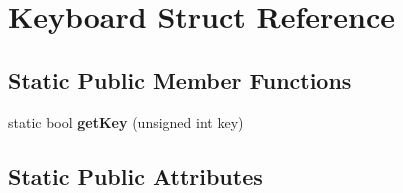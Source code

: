 \section{Keyboard Struct Reference}
\label{struct_keyboard}
\subsection*{Static Public Member Functions}
\begin{DoxyCompactItemize}
\item 
\mbox{\label{struct_keyboard_a9506493dd9a9c08d8db728193d6d73ee}} 
static bool {\bfseries get\+Key} (unsigned int key)
\end{DoxyCompactItemize}
\subsection*{Static Public Attributes}
